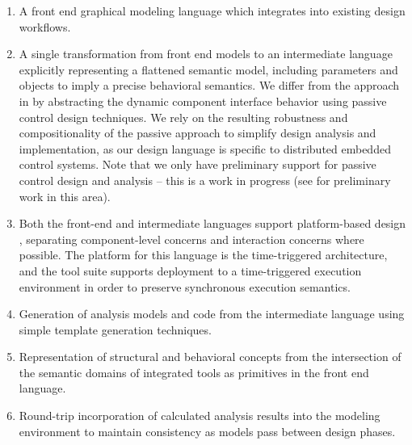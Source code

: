 \begin{enumerate}

\item A front end graphical modeling language which integrates into existing design 
workflows\cite{modeling:aces08}.

\item A single transformation from front end models to an intermediate language explicitly 
representing a flattened semantic model, including parameters and objects to imply a precise 
behavioral semantics.  We differ from the approach in \cite{modeling:hybrid_abs} by abstracting the dynamic component interface behavior using passive control design 
techniques. We rely on the resulting robustness and compositionality of the passive approach 
to simplify design analysis and implementation, as our design language is
specific to distributed embedded control systems.  Note that we only have preliminary 
support for passive control design and analysis -- this is a work in progress (see \cite{ncs:mic} 
for preliminary work in this area).

\item Both the front-end and intermediate languages support platform-based design \cite{modeling:platform}, 
separating component-level concerns and interaction concerns where possible.  The platform for this
language is the time-triggered architecture\cite{timed:tta}, and the tool suite supports deployment
to a time-triggered execution environment\cite{timed:frodo} in order to preserve synchronous execution
semantics.

\item Generation of analysis models and code from the intermediate language
using simple template generation techniques\cite{sched:analysis}.

\item Representation of structural and behavioral concepts from the intersection of the semantic 
domains of integrated tools as primitives in the front end language.

\item Round-trip incorporation of calculated analysis results into the modeling environment to 
maintain consistency as models pass between design phases.

\end{enumerate}

